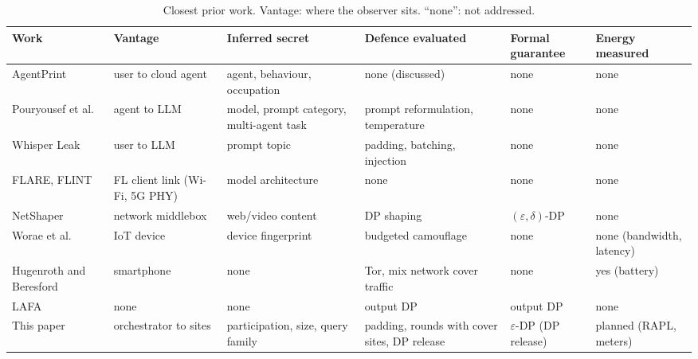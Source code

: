 \begin{table}[t]
\centering
\caption{Closest prior work. Vantage: where the observer sits. ``none'': not addressed.}\label{tab:related}
\footnotesize
\begin{tabular}{@{}p{2.5cm}p{2.5cm}p{3.1cm}p{3.1cm}p{2.0cm}p{2.3cm}@{}}
\toprule
Work & Vantage & Inferred secret & Defence evaluated & Formal guarantee & Energy measured \\
\midrule
AgentPrint~\cite{zhang2025agentprint} & user to cloud agent & agent, behaviour, occupation & none (discussed) & none & none \\
Pouryousef et al.~\cite{pouryousef2026benchmark} & agent to LLM & model, prompt category, multi-agent task & prompt reformulation, temperature & none & none \\
Whisper Leak~\cite{mcdonald2025whisper} & user to LLM & prompt topic & padding, batching, injection & none & none \\
FLARE, FLINT~\cite{shuvo2025flare,shuvo2026flint} & FL client link (Wi-Fi, 5G PHY) & model architecture & none & none & none \\
NetShaper~\cite{sabzi2024netshaper} & network middlebox & web/video content & DP shaping & $(\varepsilon,\delta)$-DP & none \\
Worae et al.~\cite{worae2026adaptive} & IoT device & device fingerprint & budgeted camouflage & none & none (bandwidth, latency) \\
Hugenroth and Beresford~\cite{hugenroth2023powering} & smartphone & none & Tor, mix network cover traffic & none & yes (battery) \\
LAFA~\cite{ji2025lafa} & none & none & output DP & output DP & none \\
\midrule
This paper & orchestrator to sites & participation, size, query family & padding, rounds with cover sites, DP release & $\varepsilon$-DP (DP release) & planned (RAPL, meters) \\
\bottomrule
\end{tabular}
\end{table}

